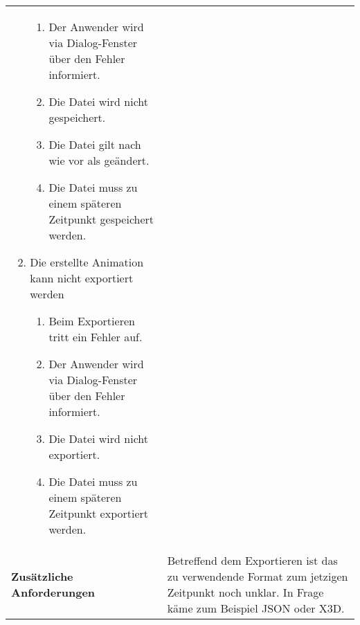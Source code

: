 \begin{longtabu}{p{0.5\textwidth}p{0.5\textwidth}}
\begin{enumerate}[label= (\alph*)]
{\begin{enumerate}[label= (\roman*)]
                    \item{Der Anwender wird via Dialog-Fenster über den Fehler
                            informiert.}
                    \item{Die Datei wird nicht gespeichert.}
                    \item{Die Datei gilt nach wie vor als geändert.}
                    \item{Die Datei muss zu einem späteren Zeitpunkt
                            gespeichert werden.}
                \end{enumerate}
            }
            \item{Die erstellte Animation kann nicht exportiert werden
                \begin{enumerate}[label= (\roman*)]
                    \item{Beim Exportieren tritt ein Fehler auf.}
                    \item{Der Anwender wird via Dialog-Fenster über den Fehler
                            informiert.}
                    \item{Die Datei wird nicht exportiert.}
                    \item{Die Datei muss zu einem späteren Zeitpunkt
                            exportiert werden.}
                \end{enumerate}
            }
        \end{enumerate}\\
    \cmidrule(r){1-1}\cmidrule(lr){2-2}
        \textbf{Zusätzliche Anforderungen} &
        Betreffend dem Exportieren ist das zu verwendende Format zum jetzigen
        Zeitpunkt noch unklar. In Frage käme zum Beispiel
        JSON\protect\footnotemark{} oder X3D\protect\footnotemark{}.
        \\
    \bottomrule
\end{longtabu}